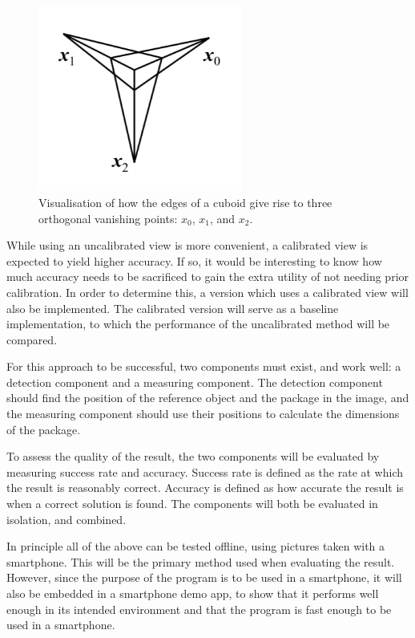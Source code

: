 \begin{figure}
\begin{center}
\includegraphics[width=0.6\textwidth]{figures/vanishing_points.png}
\end{center}
\caption{Visualisation of how the edges of a cuboid give rise to three orthogonal vanishing points: $x_0$, $x_1$, and $x_2$.} %
\label{fig:vanishing_points}
\end{figure}

While using an uncalibrated view is more convenient, a calibrated view is expected to yield higher accuracy.
If so, it would be interesting to know how much accuracy needs to be sacrificed to gain the extra utility of not needing prior calibration.
In order to determine this, a version which uses a calibrated view will also be implemented.
The calibrated version will serve as a baseline implementation, to which the performance of the uncalibrated method will be compared.

For this approach to be successful, two components must exist, and work well: a detection component and a measuring component.
The detection component should find the position of the reference object and the package in the image, and the measuring component should use their positions to calculate the dimensions of the package.

To assess the quality of the result, the two components will be evaluated by measuring success rate and accuracy.
Success rate is defined as the rate at which the result is reasonably correct.
Accuracy is defined as how accurate the result is when a correct solution is found.
The components will both be evaluated in isolation, and combined.

In principle all of the above can be tested offline, using pictures taken with a smartphone.
This will be the primary method used when evaluating the result.
However, since the purpose of the program is to be used in a smartphone, it will also be embedded in a smartphone demo app, to show that it performs well enough in its intended environment and that the program is fast enough to be used in a smartphone.

